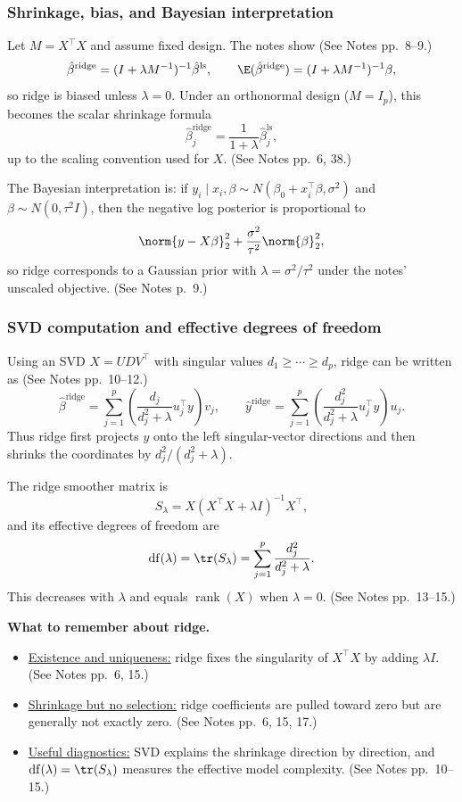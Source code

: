 \subsubsection{Shrinkage, bias, and Bayesian interpretation}
Let $M=X^\top X$ and assume fixed design. The notes show (See Notes pp.~8--9.)
\[
\hat\beta^{\mathrm{ridge}}
= (I+\lambda M^{-1})^{-1}\hat\beta^{\mathrm{ls}},
\qquad
\E(\hat\beta^{\mathrm{ridge}})
= (I+\lambda M^{-1})^{-1}\beta,
\]
so ridge is biased unless $\lambda=0$. Under an orthonormal design ($M=I_p$), this becomes the scalar shrinkage formula
\[
\hat\beta^{\mathrm{ridge}}_j
= \frac{1}{1+\lambda}\hat\beta^{\mathrm{ls}}_j,
\]
up to the scaling convention used for $X$. (See Notes pp.~6, 38.)

The Bayesian interpretation is: if $y_i\mid x_i,\beta \sim N(\beta_0+x_i^\top\beta,\sigma^2)$ and $\beta\sim N(0,\tau^2I)$, then the negative log posterior is proportional to
\[
\norm{y-X\beta}_2^2 + \frac{\sigma^2}{\tau^2}\norm{\beta}_2^2,
\]
so ridge corresponds to a Gaussian prior with $\lambda=\sigma^2/\tau^2$ under the notes' unscaled objective. (See Notes p.~9.)

\subsubsection{SVD computation and effective degrees of freedom}
Using an SVD $X=UDV^\top$ with singular values $d_1\ge \cdots\ge d_p$, ridge can be written as (See Notes pp.~10--12.)
\[
\hat\beta^{\mathrm{ridge}}
=\sum_{j=1}^p
\left(\frac{d_j}{d_j^2+\lambda}u_j^\top y\right)v_j,
\qquad
\hat y^{\mathrm{ridge}}
=\sum_{j=1}^p
\left(\frac{d_j^2}{d_j^2+\lambda}u_j^\top y\right)u_j.
\]
Thus ridge first projects $y$ onto the left singular-vector directions and then shrinks the coordinates by $d_j^2/(d_j^2+\lambda)$.

The ridge smoother matrix is
\[
S_\lambda=X(X^\top X+\lambda I)^{-1}X^\top,
\]
and its effective degrees of freedom are
\[
\operatorname{df}(\lambda)=\tr(S_\lambda)
= \sum_{j=1}^p \frac{d_j^2}{d_j^2+\lambda}.
\]
This decreases with $\lambda$ and equals $\operatorname{rank}(X)$ when $\lambda=0$. (See Notes pp.~13--15.)

\begin{mybox}
\textbf{What to remember about ridge.}
\begin{itemize}
    \item \underline{Existence and uniqueness:} ridge fixes the singularity of $X^\top X$ by adding $\lambda I$. (See Notes pp.~6, 15.)
    \item \underline{Shrinkage but no selection:} ridge coefficients are pulled toward zero but are generally not exactly zero. (See Notes pp.~6, 15, 17.)
    \item \underline{Useful diagnostics:} SVD explains the shrinkage direction by direction, and $\operatorname{df}(\lambda)=\tr(S_\lambda)$ measures the effective model complexity. (See Notes pp.~10--15.)
\end{itemize}
\end{mybox}


